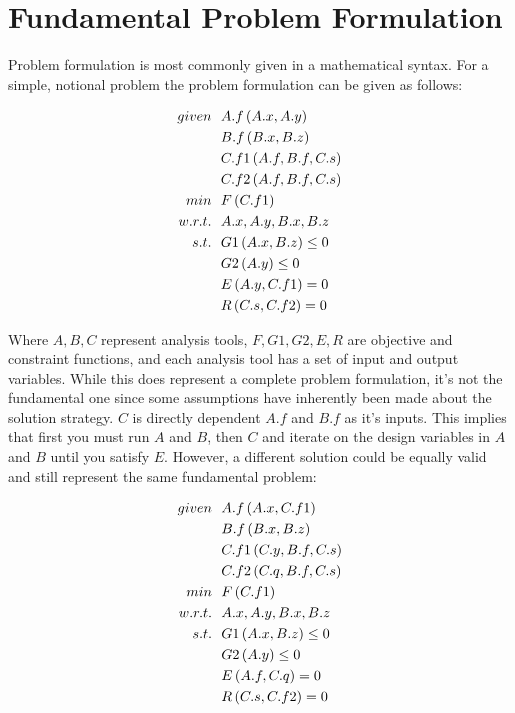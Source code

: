 \documentclass[]{aiaa-tc} %
\begin{document}
\section{Fundamental Problem Formulation}
    Problem formulation is most commonly given in a mathematical syntax. For a simple, notional problem the problem formulation
    can be given as follows:  

    \begin{align}
        given & \ \ A.f\left(A.x,A.y\right) \notag
        \\ & \ \  B.f\left(B.x,B.z\right) \notag
        \\ & \ \  C.f1\left(A.f,B.f,C.s\right) \notag
        \\ & \ \  C.f2\left(A.f,B.f,C.s\right) \notag
        \\min &\ \ F\left(C.f1\right) \notag
        \\ w.r.t. &\ \  A.x,A.y,B.x,B.z \notag
        \\ s.t. &\ \ G1\left(A.x,B.z\right) \leq 0 \notag
        \\      &\ \ G2\left(A.y\right) \leq 0 \notag
        \\      &\ \ E\left(A.y,C.f1\right) = 0 \notag
        \\      &\ \ R\left(C.s,C.f2\right) = 0 
        \label{eqn:simple}
    \end{align}

    Where $A,B,C$ represent analysis tools, $F,G1,G2,E,R$ are objective and constraint functions, and each analysis tool 
    has a set of input and output variables. While this does represent a complete problem formulation, 
    it's not the fundamental one since some assumptions have inherently been made about the solution 
    strategy. $C$ is directly dependent
    $A.f$ and $B.f$ as it's inputs. This implies that first you must run $A$ and $B$, then $C$ and
    iterate on the design variables in $A$ and $B$ until you satisfy $E$. However, a different solution could be equally valid and still represent
    the same fundamental problem: 

    \begin{align}
        given & \ \ A.f\left(A.x,C.f1\right) \notag
        \\ & \ \  B.f\left(B.x,B.z\right) \notag
        \\ & \ \  C.f1\left(C.y,B.f,C.s\right) \notag
        \\ & \ \  C.f2\left(C.q,B.f,C.s\right) \notag
        \\min &\ \ F\left(C.f1\right) \notag
        \\ w.r.t. &\ \  A.x,A.y,B.x,B.z \notag
        \\ s.t. &\ \ G1\left(A.x,B.z\right) \leq 0 \notag
        \\      &\ \ G2\left(A.y\right) \leq 0 \notag
        \\      &\ \ E\left(A.f,C.q\right) = 0 \notag
        \\      &\ \ R\left(C.s,C.f2\right) = 0 
        \label{eqn:simple_2}
    \end{align}
\end{document}
